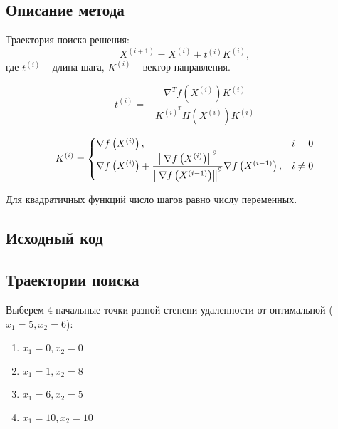 \subsection{Описание метода}

Траектория поиска решения:
\begin{equation*}
X^{(i+1)}  = X^{(i)} + t^{(i)} K^{(i)},
\end{equation*}
где $t^{(i)}$ -- длина шага, $K^{(i)}$ -- вектор направления.

\begin{equation*}
t^{(i)} = -\dfrac{\nabla^T f\left(X^{(i)}\right) K^{(i)}}{K^{(i)^T} H\left(X^{(i)}\right) K^{(i)}}
\end{equation*}

\begin{equation*}
K^{(i)} = 
\begin{cases}
\nabla f\left(X^{(i)}\right), &i = 0\\
\nabla f\left(X^{(i)}\right) + \dfrac{\left\lVert\nabla f\left(X^{(i)}\right)\right\rVert^2}{\left\lVert\nabla f\left(X^{(i-1)}\right)\right\rVert^2} \nabla f\left(X^{(i-1)}\right), &i \neq 0
\end{cases}
\end{equation*}

Для квадратичных функций число шагов равно числу переменных.

\subsection{Исходный код}



\subsection{Траектории поиска}

Выберем 4 начальные точки разной степени удаленности от оптимальной ($x_1 = 5, x_2 = 6$): 
\begin{multicols}{2} 
\begin{enumerate}
	\setlength{\itemsep}{0em}
	\item $x_1 = 0, x_2 = 0$
	\item $x_1 = 1, x_2 = 8$
	\item $x_1 = 6, x_2 = 5$
	\item $x_1 = 10, x_2 = 10$
\end{enumerate}
\end{multicols}

